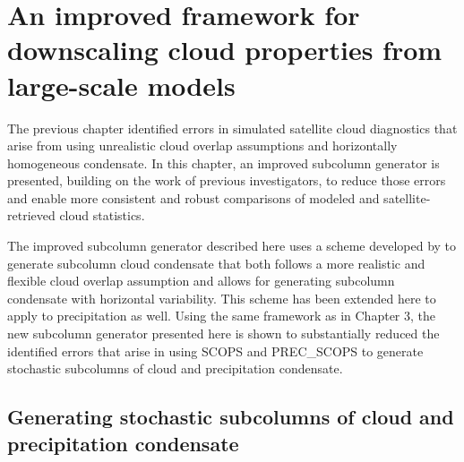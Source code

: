 \chapter{An improved framework for downscaling cloud properties from
large-scale models}\label{sec:subgrid2}

The previous chapter identified errors in simulated satellite cloud
diagnostics that arise from using unrealistic cloud overlap assumptions
and horizontally homogeneous condensate. In this chapter, an improved
subcolumn generator is presented, building on the work of previous
investigators, to reduce those errors and enable more consistent and
robust comparisons of modeled and satellite-retrieved cloud statistics.

The improved subcolumn generator described here uses a scheme developed
by \citet{raisanen_et_al_2004} to generate subcolumn cloud condensate
that both follows a more realistic and flexible cloud overlap assumption
and allows for generating subcolumn condensate with horizontal
variability. This scheme has been extended here to apply to
precipitation as well. Using the same framework as in Chapter 3, the new
subcolumn generator presented here is shown to substantially reduced the
identified errors that arise in using SCOPS and PREC\_SCOPS to generate
stochastic subcolumns of cloud and precipitation condensate.

\section{Generating stochastic subcolumns of cloud and precipitation
condensate}\label{sec:subgrid2Generator}

